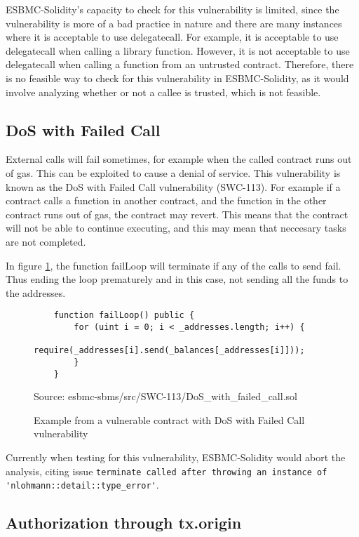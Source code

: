 ESBMC-Solidity's capacity to check for this vulnerability is limited, since the vulnerability is more of a bad practice in nature and there are many instances where it is acceptable to use delegatecall. For example, it is acceptable to use delegatecall when calling a library function. However, it is not acceptable to use delegatecall when calling a function from an untrusted contract. Therefore, there is no feasible way to check for this vulnerability in ESBMC-Solidity, as it would involve analyzing whether or not a callee is trusted, which is not feasible. 

\subsection{DoS with Failed Call}
\label{sec:dos_with_failed_call}

External calls will fail sometimes, for example when the called contract runs out of gas. This can be exploited to cause a denial of service. This vulnerability is known as the DoS with Failed Call vulnerability (SWC-113). For example if a contract calls a function in another contract, and the function in the other contract runs out of gas, the contract may revert. This means that the contract will not be able to continue executing, and this may mean that neccesary tasks are not completed.

In figure \ref{fig:failed_call}, the function failLoop will terminate if any of the calls to send fail. Thus ending the loop prematurely and in this case, not sending all the funds to the addresses. 


\begin{figure}
\begin{lstlisting}
    function failLoop() public {
        for (uint i = 0; i < _addresses.length; i++) {
            require(_addresses[i].send(_balances[_addresses[i]]));
        }
    }
\end{lstlisting}
\caption{Example from a vulnerable contract with DoS with Failed Call vulnerability}
\label{fig:failed_call}
Source: esbmc-sbms/src/SWC-113/DoS\_with\_failed\_call.sol
\end{figure}

Currently when testing for this vulnerability, ESBMC-Solidity would abort the analysis, citing issue \verb|terminate called after throwing an instance of 'nlohmann::detail::type_error'|. 

\subsection{Authorization through tx.origin}
\label{sec:authorization_through_tx.origin}

